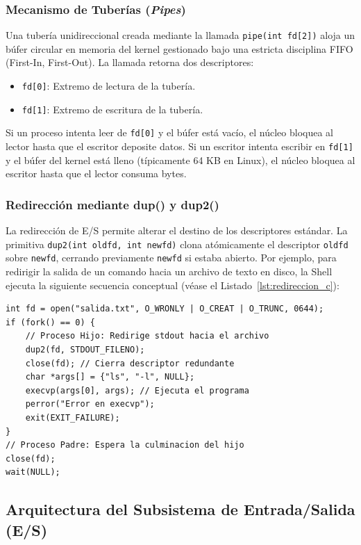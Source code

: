 \documentclass[11pt,letterpaper]{article}
\begin{document}
\subsubsection{Mecanismo de Tuberías (\textit{Pipes})}
Una tubería unidireccional creada mediante la llamada \texttt{pipe(int fd[2])} aloja un búfer circular en memoria del kernel gestionado bajo una estricta disciplina FIFO (First-In, First-Out). La llamada retorna dos descriptores:
\begin{itemize}
    \item \texttt{fd[0]}: Extremo de lectura de la tubería.
    \item \texttt{fd[1]}: Extremo de escritura de la tubería.
\end{itemize}
Si un proceso intenta leer de \texttt{fd[0]} y el búfer está vacío, el núcleo bloquea al lector hasta que el escritor deposite datos. Si un escritor intenta escribir en \texttt{fd[1]} y el búfer del kernel está lleno (típicamente 64 KB en Linux), el núcleo bloquea al escritor hasta que el lector consuma bytes.

\subsubsection{Redirección mediante dup() y dup2()}
La redirección de E/S permite alterar el destino de los descriptores estándar. La primitiva \texttt{dup2(int oldfd, int newfd)} clona atómicamente el descriptor \texttt{oldfd} sobre \texttt{newfd}, cerrando previamente \texttt{newfd} si estaba abierto. Por ejemplo, para redirigir la salida de un comando hacia un archivo de texto en disco, la Shell ejecuta la siguiente secuencia conceptual (véase el Listado~\ref{lst:redireccion_c}):

\begin{lstlisting}[caption={Mecanismo canónico de redirección de E/S en C usando dup2 y execvp.}, label={lst:redireccion_c}]
int fd = open("salida.txt", O_WRONLY | O_CREAT | O_TRUNC, 0644);
if (fork() == 0) {
    // Proceso Hijo: Redirige stdout hacia el archivo
    dup2(fd, STDOUT_FILENO);
    close(fd); // Cierra descriptor redundante
    char *args[] = {"ls", "-l", NULL};
    execvp(args[0], args); // Ejecuta el programa
    perror("Error en execvp");
    exit(EXIT_FAILURE);
}
// Proceso Padre: Espera la culminacion del hijo
close(fd);
wait(NULL);
\end{lstlisting}

\subsection{Arquitectura del Subsistema de Entrada/Salida (E/S)}
\end{document}

